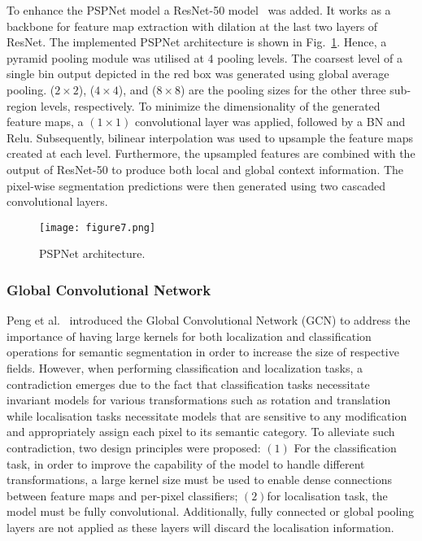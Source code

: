 To enhance the PSPNet model a ResNet-50 model~\cite{He2016} was added. 
It works as a backbone for feature map extraction with dilation at the last two layers of ResNet. 
The implemented PSPNet architecture is shown in Fig.~\ref{fig:PSPNet}.
Hence, a pyramid pooling module was utilised at \(4\) pooling levels.
The coarsest level of a single bin output depicted in the red box was generated using global average pooling.
(\(2\times2\)), (\(4\times 4\)), and (\(8\times8\)) are the pooling sizes for the other three sub-region levels, respectively.
To minimize the dimensionality of the generated feature maps, a \((1\times 1)\) convolutional layer was applied, followed by a BN and Relu.
Subsequently, bilinear interpolation was used to upsample the feature maps created at each level.
Furthermore, the upsampled features are combined with the output of ResNet-50 to produce both local and global context information.
The pixel-wise segmentation predictions were then generated using two cascaded convolutional layers. 
\begin{figure} [h!]
	\centering
	\texttt{[image: figure7.png]}
	\caption{PSPNet architecture.} 
	\label{fig:PSPNet}
\end{figure} 
\subsubsection{Global Convolutional Network}
Peng et al.~\cite{Peng2017} introduced the Global Convolutional Network (GCN) to address the importance of having large kernels for both localization and classification operations for semantic segmentation in order to increase the size of respective fields.
However, when performing classification and localization tasks, a contradiction emerges due to the fact that classification tasks necessitate invariant models for various transformations such as rotation and translation while localisation tasks necessitate models that are sensitive to any modification and appropriately assign each pixel to its semantic category.
To alleviate such contradiction, two design principles were proposed:
\((1)\) For the classification task, in order to improve the capability of 
the model to handle different transformations, a large kernel size must be 
used to enable dense connections between feature maps and per-pixel 
classifiers; \((2)\)for localisation task, the model must be fully convolutional. 
Additionally, fully connected or global pooling layers are not applied as 
these layers will discard the localisation information. 

